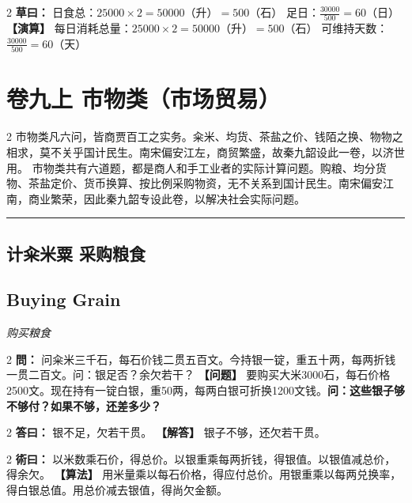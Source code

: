 \documentclass[11pt,a4paper]{article}
\newcommand{\longline}{\noindent\rule{\textwidth}{0.4pt}}
\newcommand{\bilingualProblem}[2]{%
  \vspace{0.6em}%
  \begin{paracol}{2}%
  \noindent\textcolor{problemcolor}{\textbf{問：}}#1%
  \switchcolumn%
  \noindent\textcolor{problemcolor}{\textbf{【问题】}}#2%
  \end{paracol}%
  \vspace{0.3em}%
}
\newcommand{\bilingualAnswer}[2]{%
  \begin{paracol}{2}%
  \noindent\textcolor{answercolor}{\textbf{答曰：}}#1%
  \switchcolumn%
  \noindent\textcolor{answercolor}{\textbf{【解答】}}#2%
  \end{paracol}%
  \vspace{0.3em}%
}
\newcommand{\bilingualMethod}[2]{%
  \begin{paracol}{2}%
  \noindent\textcolor{methodcolor}{\textbf{術曰：}}#1%
  \switchcolumn%
  \noindent\textcolor{methodcolor}{\textbf{【算法】}}#2%
  \end{paracol}%
  \vspace{0.3em}%
}
\newcommand{\bilingualWorking}[2]{%
  \begin{paracol}{2}%
  \noindent\textcolor{workingcolor}{\textbf{草曰：}}#1%
  \switchcolumn%
  \noindent\textcolor{workingcolor}{\textbf{【演算】}}#2%
  \end{paracol}%
  \vspace{0.3em}%
}
\newcommand{\bilingualSubsection}[2]{%
  \subsection{#1}
  \begin{center}
  {\small\color{sectioncolor}\textit{#2}}
  \end{center}
  \vspace{0.3em}
}
\begin{document}
\bilingualWorking{%
日食总：$25000 \times 2 = 50000$（升）$= 500$（石）
足日：$\displaystyle\frac{30000}{500} = 60$（日）%
}{%
每日消耗总量：$25000 \times 2 = 50000$（升）$= 500$（石）
可维持天数：$\displaystyle\frac{30000}{500} = 60$（天）%
}

\newpage

\section{卷九上 \quad 市物类（市场贸易）}
\label{sec:fasc9a}

\begin{center}
\end{center}

\medskip

\begin{paracol}{2}
市物类凡六问，皆商贾百工之实务。籴米、均货、茶盐之价、钱陌之换、物物之相求，莫不关乎国计民生。南宋偏安江左，商贸繁盛，故秦九韶设此一卷，以济世用。
\switchcolumn
市物类共有六道题，都是商人和手工业者的实际计算问题。购粮、均分货物、茶盐定价、货币换算、按比例采购物资，无不关系到国计民生。南宋偏安江南，商业繁荣，因此秦九韶专设此卷，以解决社会实际问题。
\end{paracol}

\vspace{0.8em}
\longline

\subsection{计籴米粟 \quad 采购粮食}
\bilingualSubsection{Buying Grain}{购买粮食}

\bilingualProblem{%
问籴米三千石，每石价钱二贯五百文。今持银一锭，重五十两，每两折钱一贯二百文。问：银足否？余欠若干？%
}{%
要购买大米3000石，每石价格2500文。现在持有一锭白银，重50两，每两白银可折换1200文钱。\textbf{问：这些银子够不够付？如果不够，还差多少？}%
}

\bilingualAnswer{%
银不足，欠若干贯。%
}{%
银子不够，还欠若干贯。%
}

\bilingualMethod{%
以米数乘石价，得总价。以银重乘每两折钱，得银值。以银值减总价，得余欠。%
}{%
用米量乘以每石价格，得应付总价。用银重乘以每两兑换率，得白银总值。用总价减去银值，得尚欠金额。%
}
\end{document}
